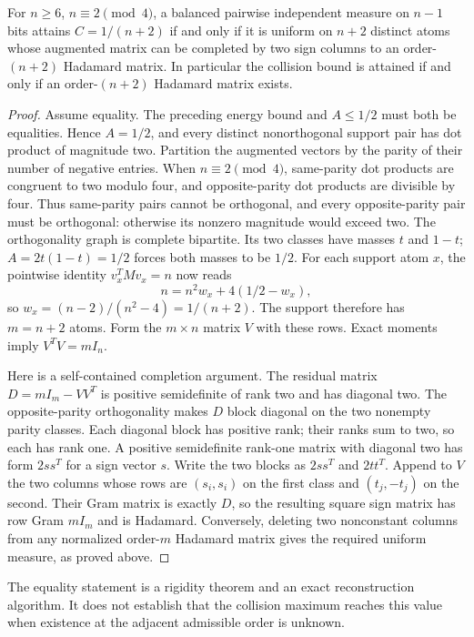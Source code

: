 \begin{theorem}
\label{thm:discrete-parity-equality}
For $n\ge6$, $n\equiv2\pmod4$, a balanced pairwise independent measure
on $n-1$ bits attains $C=1/(n+2)$ if and only if it is uniform on
$n+2$ distinct atoms whose augmented matrix can be completed by two
sign columns to an order-$(n+2)$ Hadamard matrix.
In particular the collision bound is attained if and only if an
order-$(n+2)$ Hadamard matrix exists.
\end{theorem}
\begin{proof}
Assume equality. The preceding energy bound and $A\le1/2$ must
both be equalities. Hence $A=1/2$, and every distinct nonorthogonal
support pair has dot product of magnitude two.
Partition the augmented vectors by the parity of their number of
negative entries. When $n\equiv2\pmod4$, same-parity dot products
are congruent to two modulo four, and opposite-parity dot products
are divisible by four. Thus same-parity pairs cannot be orthogonal,
and every opposite-parity pair must be orthogonal: otherwise its
nonzero magnitude would exceed two. The orthogonality graph is
complete bipartite. Its two classes have masses $t$ and $1-t$;
$A=2t(1-t)=1/2$ forces both masses to be $1/2$.
For each support atom $x$, the pointwise identity $v_x^TMv_x=n$
now reads
\[
 n=n^2w_x+4(1/2-w_x),
\]
so $w_x=(n-2)/(n^2-4)=1/(n+2)$. The support therefore has
$m=n+2$ atoms. Form the $m\times n$ matrix $V$ with these rows.
Exact moments imply $V^TV=mI_n$.

Here is a self-contained completion argument. The residual matrix
$D=mI_m-VV^T$ is positive semidefinite of rank two and has diagonal
two. The opposite-parity orthogonality makes $D$ block diagonal on
the two nonempty parity classes. Each diagonal block has positive
rank; their ranks sum to two, so each has rank one. A positive
semidefinite rank-one matrix with diagonal two has form $2ss^T$
for a sign vector $s$. Write the two blocks as $2ss^T$ and $2tt^T$.
Append to $V$ the two columns whose rows are $(s_i,s_i)$ on the
first class and $(t_j,-t_j)$ on the second. Their Gram matrix is
exactly $D$, so the resulting square sign matrix has row Gram
$mI_m$ and is Hadamard. Conversely, deleting two nonconstant columns
from any normalized order-$m$ Hadamard matrix gives the required
uniform measure, as proved above.
\end{proof}
The equality statement is a rigidity theorem and an exact reconstruction
algorithm. It does not establish that the collision maximum reaches
this value when existence at the adjacent admissible order is unknown.

